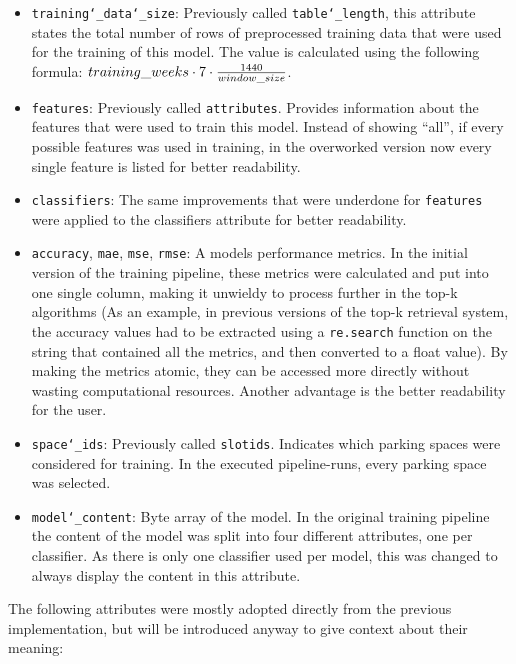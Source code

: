 \begin{itemize}
\item \texttt{training\char`_data\char`_size}: Previously called \texttt{table\char`_length}, this attribute states the total number of rows of preprocessed training data that were used for the training of this model. The value is calculated using the following formula: $training\char`_weeks \cdot 7 \cdot \frac{1440}{window\char`_size}$.
\item  \texttt{features}: Previously called \texttt{attributes}. Provides information about the features that were used to train this model. Instead of showing “all”, if every possible features was used in training, in the overworked version now every single feature is listed for better readability. 
\item  \texttt{classifiers}:  The same improvements that were underdone for \texttt{features} were applied to the classifiers attribute for better readability. 
\item  \texttt{accuracy}, \texttt{mae}, \texttt{mse}, \texttt{rmse}: A models performance metrics. In the initial version of the training pipeline, these metrics were calculated and put into one single column, making it unwieldy to process further in the top-k algorithms (As an example, in previous versions of the top-k retrieval system, the accuracy values had to be extracted using a \texttt{re.search} function on the string that contained all the metrics, and then converted to a float value). By making the metrics atomic, they can be accessed more directly without wasting computational resources. Another advantage is the better readability for the user.
\item \texttt{space\char`_ids}: Previously called \texttt{slotids}.
Indicates which parking spaces were considered for training. In the executed pipeline-runs, every parking space was selected.
\item  \texttt{model\char`_content}: Byte array of the model. In the original training pipeline the content of the model was split into four different attributes, one per classifier. As there is only one classifier used per model, this was changed to always display the content in this attribute.
\end{itemize}

The following attributes were mostly adopted directly from the previous implementation, but will be introduced anyway to give context about their meaning:

